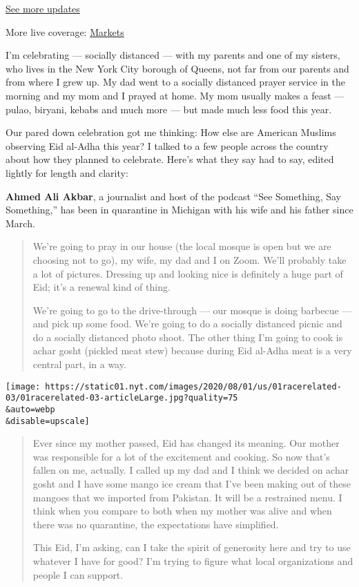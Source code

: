 \href{https://www.nytimes.com/2020/08/01/world/coronavirus-covid-19.html?action=click\&pgtype=Article\&state=default\&region=MAIN_CONTENT_1\&context=storylines_live_updates}{See
more updates}

More live coverage:
\href{https://www.nytimes.com/live/2020/07/31/business/stock-market-today-coronavirus?action=click\&pgtype=Article\&state=default\&region=MAIN_CONTENT_1\&context=storylines_live_updates}{Markets}

I'm celebrating --- socially distanced --- with my parents and one of my
sisters, who lives in the New York City borough of Queens, not far from
our parents and from where I grew up. My dad went to a socially
distanced prayer service in the morning and my mom and I prayed at home.
My mom usually makes a feast --- pulao, biryani, kebabs and much more
--- but made much less food this year.

Our pared down celebration got me thinking: How else are American
Muslims observing Eid al-Adha this year? I talked to a few people across
the country about how they planned to celebrate. Here's what they say
had to say, edited lightly for length and clarity:

\textbf{Ahmed Ali Akbar}, a journalist and host of the podcast ``See
Something, Say Something,'' has been in quarantine in Michigan with his
wife and his father since March.

\begin{quote}
We're going to pray in our house (the local mosque is open but we are
choosing not to go), my wife, my dad and I on Zoom. We'll probably take
a lot of pictures. Dressing up and looking nice is definitely a huge
part of Eid; it's a renewal kind of thing.

We're going to go to the drive-through --- our mosque is doing barbecue
--- and pick up some food. We're going to do a socially distanced picnic
and do a socially distanced photo shoot. The other thing I'm going to
cook is achar gosht (pickled meat stew) because during Eid al-Adha meat
is a very central part, in a way.
\end{quote}

\texttt{[image: https://static01.nyt.com/images/2020/08/01/us/01racerelated-03/01racerelated-03-articleLarge.jpg?quality=75\\\&auto=webp\\\&disable=upscale]}

\begin{quote}
Ever since my mother passed, Eid has changed its meaning. Our mother was
responsible for a lot of the excitement and cooking. So now that's
fallen on me, actually. I called up my dad and I think we decided on
achar gosht and I have some mango ice cream that I've been making out of
these mangoes that we imported from Pakistan. It will be a restrained
menu. I think when you compare to both when my mother was alive and when
there was no quarantine, the expectations have simplified.

This Eid, I'm asking, can I take the spirit of generosity here and try
to use whatever I have for good? I'm trying to figure what local
organizations and people I can support.
\end{quote}

